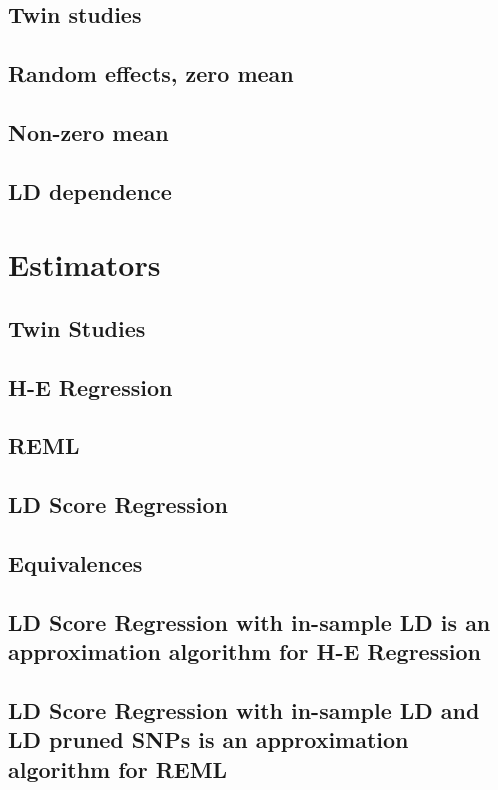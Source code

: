 \documentclass[11pt]{article}
\begin{document}
\subsection{Twin studies}

\subsection{Random effects, zero mean}

\subsection{Non-zero mean}

\subsection{LD dependence}

\section{Estimators}

\subsection{Twin Studies}

\subsection{H-E Regression}

\subsection{REML}

\subsection{LD Score Regression}

\subsection{Equivalences}

\subsection{LD Score Regression with in-sample LD is an approximation algorithm for H-E Regression}

\subsection{LD Score Regression with in-sample LD and LD pruned SNPs is an approximation algorithm for REML}
\end{document}
